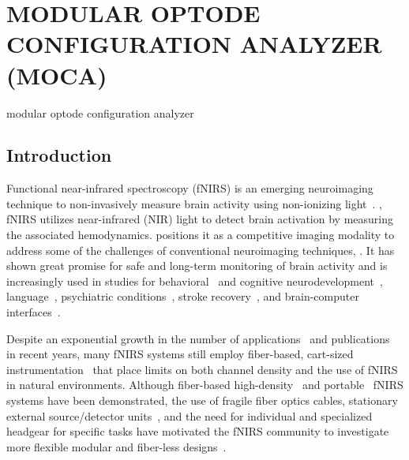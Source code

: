 
\chapter{MODULAR OPTODE CONFIGURATION ANALYZER (MOCA)} %
modular optode configuration analyzer
\label{chap:moca}



\section{Introduction}
\label{sec:introduction}
Functional near-infrared spectroscopy (fNIRS) is an emerging neuroimaging technique to non-invasively measure brain activity using non-ionizing light~\cite{Ferrari2012}. , fNIRS utilizes near-infrared (NIR) light to detect brain activation by measuring the associated hemodynamics.  positions it as a competitive imaging modality to address some of the challenges of conventional neuroimaging techniques, . It has shown great promise for safe and long-term monitoring of brain activity and is increasingly used in studies for behavioral~\cite{McDonald2018} and cognitive neurodevelopment~\cite{Aslin2015, Vanderwert2014, Wilcox2015, Soltanlou2018}, language~\cite{Quaresima2012, Rossi2012}, psychiatric conditions~\cite{Ehlis2014, Kumar2017}, stroke recovery~\cite{Yang2019}, and brain-computer interfaces~\cite{Naseer2015, Ahn2017, Hong2018}. 

Despite an exponential growth in the number of applications~\cite{Boas2014, Quaresima2019} and publications~\cite{Yucel2017} in recent years, many fNIRS systems still employ fiber-based, cart-sized instrumentation~\cite{Scholkmann2014} that place limits on both channel density and the use of fNIRS in natural environments. Although fiber-based high-density~\cite{Eggebrecht2014} and portable~\cite{Wheelock2019} fNIRS systems have been demonstrated, the use of fragile fiber optics cables, stationary external source/detector units~\cite{Oxymon2017, Techen2018}, and the need for individual and specialized headgear for specific tasks have motivated the fNIRS community to investigate more flexible modular and fiber-less designs~\cite{Zhao2017, Curtin2018}.

